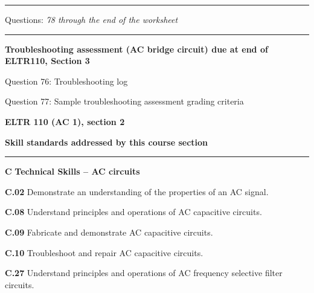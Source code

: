\vskip 10pt
\hrule \vskip 5pt
\noindent
{}

\hskip 10pt Questions: {\it 78 through the end of the worksheet}
 
\vskip 10pt
\hrule \vskip 5pt
\noindent
{}

\hskip 10pt {\bf Troubleshooting assessment (AC bridge circuit) due at end of ELTR110, Section 3}
 
\hskip 10pt Question 76: Troubleshooting log
 
\hskip 10pt Question 77: Sample troubleshooting assessment grading criteria
 
\vskip 10pt








\vfil \eject

\centerline{\bf ELTR 110 (AC 1), section 2} \bigskip 
 
\vskip 10pt

\noindent
{\bf Skill standards addressed by this course section}

\vskip 5pt

\hrule \vskip 10pt
\noindent
{}

\vskip 5pt

\medskip
\item{\bf C} {\bf Technical Skills -- AC circuits}
\item{\bf C.02} Demonstrate an understanding of the properties of an AC signal.
\item{\bf C.08} Understand principles and operations of AC capacitive circuits.
\item{\bf C.09} Fabricate and demonstrate AC capacitive circuits.
\item{\bf C.10} Troubleshoot and repair AC capacitive circuits.
\item{\bf C.27} Understand principles and operations of AC frequency selective filter circuits.
\medskip

\vskip 5pt

